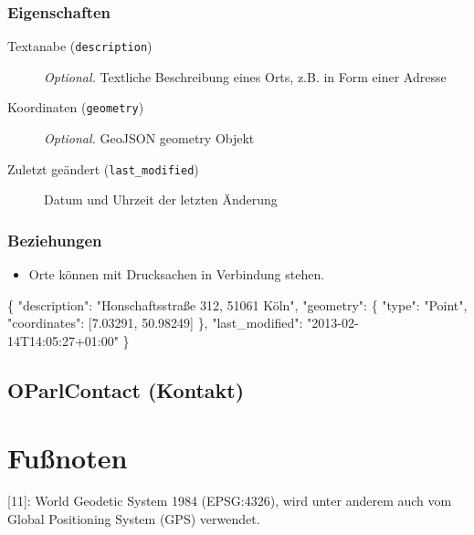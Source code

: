 \documentclass[,a4paper]{article}
\newenvironment{Shaded}{}{}
\newcommand{\DataTypeTok}[1]{\textcolor[rgb]{0.56,0.13,0.00}{{#1}}}
\newcommand{\FloatTok}[1]{\textcolor[rgb]{0.25,0.63,0.44}{{#1}}}
\newcommand{\StringTok}[1]{\textcolor[rgb]{0.25,0.44,0.63}{{#1}}}
\newcommand{\NormalTok}[1]{{#1}}
\begin{document}
\subsubsection{Eigenschaften}

\begin{description}
\item[Textanabe (\texttt{description})]
\emph{Optional.} Textliche Beschreibung eines Orts, z.B. in Form einer
Adresse
\item[Koordinaten (\texttt{geometry})]
\emph{Optional.} GeoJSON geometry Objekt
\item[Zuletzt geändert (\texttt{last\_modified})]
Datum und Uhrzeit der letzten Änderung
\end{description}

\subsubsection{Beziehungen}

\begin{itemize}
\item
  Orte können mit Drucksachen in Verbindung stehen.
\end{itemize}

\begin{Shaded}
\begin{Highlighting}[]
\NormalTok{\{}
    \DataTypeTok{"description"}\NormalTok{: }\StringTok{"Honschaftsstraße 312, 51061 Köln"}\NormalTok{,}
    \DataTypeTok{"geometry"}\NormalTok{: \{}
        \DataTypeTok{"type"}\NormalTok{: }\StringTok{"Point"}\NormalTok{,}
        \DataTypeTok{"coordinates"}\NormalTok{: [}\FloatTok{7.03291}\NormalTok{, }\FloatTok{50.98249}\NormalTok{]}
    \NormalTok{\},}
    \DataTypeTok{"last_modified"}\NormalTok{: }\StringTok{"2013-02-14T14:05:27+01:00"}
\NormalTok{\}}
\end{Highlighting}
\end{Shaded}

\subsection{OParlContact (Kontakt)}

\section{Fußnoten}

{[}11{]}: World Geodetic System 1984 (EPSG:4326), wird unter anderem
auch vom Global Positioning System (GPS) verwendet.
\end{document}
